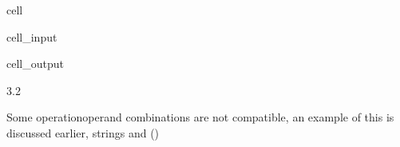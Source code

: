 \documentclass[letterpaper,10pt,english]{jupyterBook}
\begin{document}
\begin{sphinxuseclass}{cell}\begin{sphinxVerbatimInput}

\begin{sphinxuseclass}{cell_input}
\begin{sphinxVerbatim}[commandchars=\\\{\}]
  
\end{sphinxVerbatim}

\end{sphinxuseclass}\end{sphinxVerbatimInput}
\begin{sphinxVerbatimOutput}

\begin{sphinxuseclass}{cell_output}
\begin{sphinxVerbatim}[commandchars=\\\{\}]
3.2
\end{sphinxVerbatim}

\end{sphinxuseclass}\end{sphinxVerbatimOutput}

\end{sphinxuseclass}
\sphinxAtStartPar
Some operation\sphinxhyphen{}operand combinations are not compatible, an example of this is discussed earlier, strings and (\sphinxcode{\sphinxupquote{\sphinxhyphen{}}})
\end{document}
